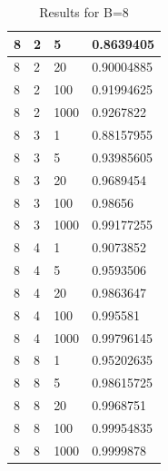 \documentclass[11pt]{article}
\begin{document}
\begin{table}
{\begin{tabular}{|l|l|l|l|}
8          & 2          & 5        &0.8639405 \\ \hline
8          & 2          & 20        &0.90004885 \\ \hline
8          & 2          & 100        &0.91994625 \\ \hline
8          & 2          & 1000        &0.9267822 \\ \hline
8          & 3          & 1        &0.88157955 \\ \hline
8          & 3          & 5        &0.93985605 \\ \hline
8          & 3          & 20        &0.9689454 \\ \hline
8          & 3          & 100        &0.98656 \\ \hline
8          & 3          & 1000        &0.99177255 \\ \hline
8          & 4          & 1        &0.9073852 \\ \hline
8          & 4          & 5        &0.9593506 \\ \hline
8          & 4          & 20        &0.9863647 \\ \hline
8          & 4          & 100        &0.995581 \\ \hline
8          & 4          & 1000        &0.99796145 \\ \hline
8          & 8          & 1        &0.95202635 \\ \hline
8          & 8          & 5        &0.98615725 \\ \hline
8          & 8          & 20        &0.9968751 \\ \hline
8          & 8          & 100        &0.99954835 \\ \hline
8          & 8          & 1000        &0.9999878 \\ \hline
\end{tabular}
\caption{Results for B=8}
}
\end{table}
\end{document}
